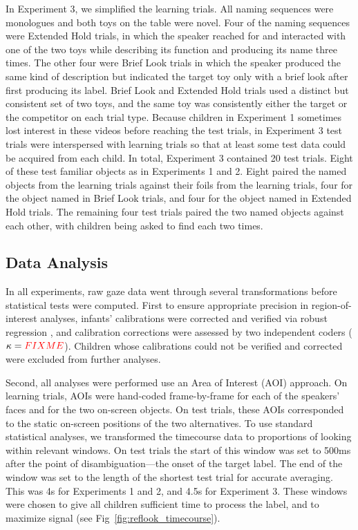 \documentclass{pnastwo}
\newcommand{\red}[1]{\textcolor{red}{#1}}
\begin{document}
\begin{article}
\begin{materials}
In Experiment 3, we simplified the learning trials. All naming sequences were monologues and both toys on the table were novel.  Four of the naming sequences were Extended Hold trials, in which the speaker reached for and interacted with one of the two toys while describing its function and producing its name three times. The other four were Brief Look trials in which the speaker produced the same kind of description but indicated the target toy only with a brief look after first producing its label. Brief Look and Extended Hold trials used a distinct but consistent set of two toys, and the same toy was consistently either the target or the competitor on each trial type. Because children in Experiment 1 sometimes lost interest in these videos before reaching the test trials, in Experiment 3 test trials were interspersed with learning trials so that at least some test data could be acquired from each child. In total, Experiment 3 contained 20 test trials. Eight of these test familiar objects as in Experiments 1 and 2. Eight paired the named objects from the learning trials against their foils from the learning trials, four for the object named in Brief Look trials, and four for the object named in Extended Hold trials. The remaining four test trials paired the two named objects against each other, with children being asked to find each two times.

\subsection{Data Analysis}

In all experiments, raw gaze data went through several transformations before statistical tests were computed. First to ensure appropriate precision in region-of-interest analyses, infants' calibrations were corrected and verified via robust regression \citep[described in][]{frank2012}, and calibration corrections were assessed by two independent coders ($\kappa = \red{FIXME}$). Children whose calibrations could not be verified and corrected were excluded from further analyses.

Second, all analyses were performed use an Area of Interest (AOI) approach. On learning trials, AOIs were hand-coded frame-by-frame for each of the speakers' faces and for the two on-screen objects. On test trials, these AOIs corresponded to the static on-screen positions of the two alternatives. To use standard statistical analyses, we transformed the timecourse data to proportions of looking within relevant windows. On test trials the start of this window was set to 500ms after the point of disambiguation---the onset of the target label. The end of the window was set to the length of the shortest test trial for accurate averaging. This was 4s for Experiments 1 and 2, and 4.5s for Experiment 3. These windows were chosen to give all children sufficient time to process the label, and to maximize signal (see Fig~\ref{fig:reflook_timecourse}).


\end{materials}
\end{article}
\end{document}
